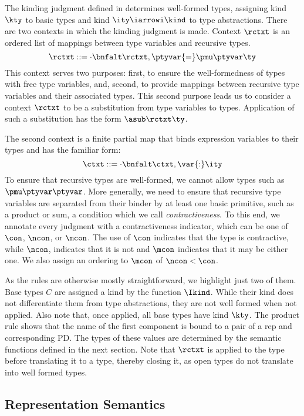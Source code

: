 The kinding judgment defined in  determines
well-formed \ddc{} types, assigning kind $\kty$ to basic types and
kind $\ity \iarrowi \kind$ to type abstractions. There are two
contexts in which the kinding judgment is made. Context $\rctxt$ is an ordered list of mappings between type variables and recursive types.
\[
\rctxt \mathrel{::=} \cdot \bnfalt \rctxt,\ptyvar{=}\pmu \ptyvar \ty
\]
This context serves two purposes: first, to ensure the well-formedness
of types with free type variables, and, second, to provide mappings
between recursive type variables and their associated types. 
This second purpose leads us to consider a context $\rctxt$ to be a
substitution from type variables to types. Application of such a
substitution has the form $\asub \rctxt \ty$.

The second context is a finite partial map that binds expression
variables to their types and has the familiar form:
\[
\ctxt \mathrel{::=} \cdot \bnfalt \ctxt,{\var{:}\ity}
\]
To ensure that recursive types are well-formed, 
we cannot allow types such as $\pmu \ptyvar
\ptyvar$. More generally, we need to ensure that
recursive type variables are separated from their binder by at least
one basic primitive, such as a product or sum, a condition which we call {\it contractiveness}. To this end, we annotate every judgment with a contractiveness
indicator, which can be one of $\con$, $\ncon$, or $\mcon$. The use of
$\con$ indicates that the type is contractive, while $\ncon$,
indicates that it is not and $\mcon$ indicates that it may be either
one. We also assign an ordering to $\mcon$ of $\ncon < \con$. 

As the rules are otherwise mostly straightforward, we highlight
just two of them. Base types $C$ are assigned a kind by the function
$\Ikind$. While their kind does not differentiate them from type
abstractions, they are not well formed when not applied.  Also note
that, once applied, all base types have kind $\kty$. The product rule
shows that the name of the first component is bound to a pair of a rep and corresponding PD.
The types of these values are determined by the semantic functions defined in the
next section.  Note that $\rctxt$ is applied to the type before
translating it to a \implang{} type, thereby closing it, as open \ddc{}
types do not translate into well formed \implang{} types.

\subsection{Representation Semantics}
\label{sec:intty-sem}

